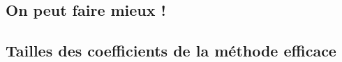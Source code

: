 \subsection{On peut faire mieux !} 







\subsection{Tailles des coefficients de la méthode efficace} 




